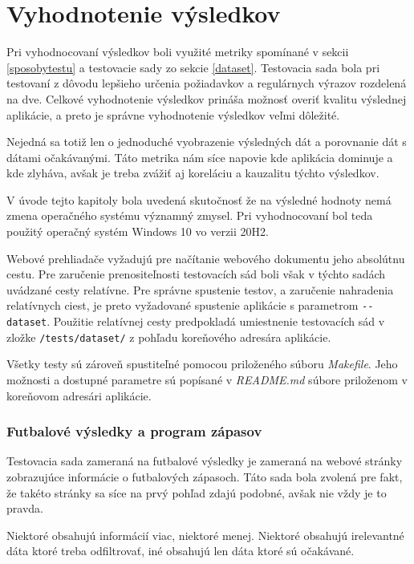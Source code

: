 \newpage

\section{Vyhodnotenie výsledkov}

Pri vyhodnocovaní výsledkov boli využité metriky spomínané v sekcii \ref{sposobytestu} a testovacie sady zo sekcie \ref{dataset}. Testovacia sada  bola pri testovaní z dôvodu lepšieho určenia požiadavkov a regulárnych výrazov rozdelená na dve. Celkové vyhodnotenie výsledkov prináša možnosť overiť kvalitu výslednej aplikácie, a preto je správne vyhodnotenie výsledkov veľmi dôležité. 

Nejedná sa totiž len o jednoduché vyobrazenie výsledných dát a porovnanie dát s dátami očakávanými. Táto metrika nám síce napovie kde aplikácia dominuje a kde zlyháva, avšak je treba zvážiť aj koreláciu a kauzalitu týchto výsledkov. 

V úvode tejto kapitoly bola uvedená skutočnosť že na výsledné hodnoty nemá zmena operačného systému významný zmysel. Pri vyhodnocovaní bol teda použitý operačný systém Windows 10 vo verzii 20H2.

Webové prehliadače vyžadujú pre načítanie webového dokumentu jeho absolútnu cestu. Pre zaručenie prenositeľnosti testovacích sád boli však v  týchto sadách uvádzané cesty relatívne. Pre správne spustenie testov, a zaručenie nahradenia relatívnych ciest, je preto vyžadované spustenie aplikácie s parametrom \texttt{-{}-dataset}. Použitie relatívnej cesty predpokladá umiestnenie testovacích sád v zložke \texttt{/tests/dataset/} z pohľadu koreňového adresára aplikácie.

Všetky testy sú zároveň spustiteľné pomocou priloženého súboru \textit{Makefile}. Jeho možnosti a dostupné parametre sú popísané v \textit{README.md} súbore priloženom v koreňovom adresári aplikácie.

\subsubsection{Futbalové výsledky a program zápasov}

Testovacia sada zameraná na futbalové výsledky je zameraná na webové stránky zobrazujúce informácie o futbalových zápasoch. Táto sada bola zvolená pre fakt, že takéto stránky sa síce na prvý pohľad zdajú podobné, avšak nie vždy je to pravda. 

Niektoré obsahujú informácií viac, niektoré menej. Niektoré obsahujú irelevantné dáta ktoré treba odfiltrovať, iné obsahujú len dáta ktoré sú očakávané.

